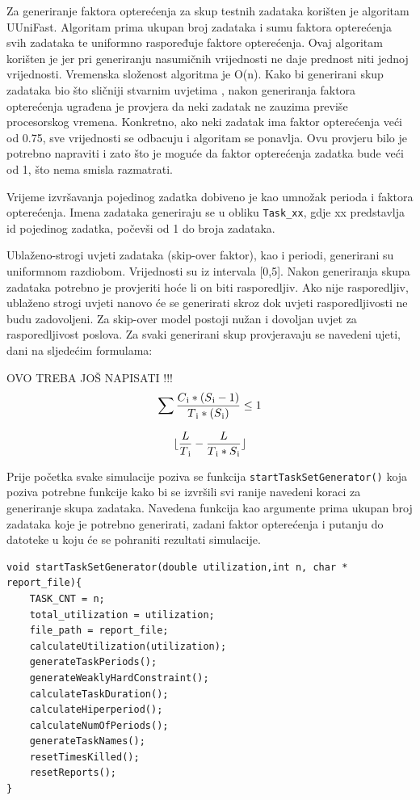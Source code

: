 \documentclass[../zavrsni.tex]{subfiles}
\begin{document}
Za generiranje faktora opterećenja za skup testnih zadataka korišten je algoritam UUniFast. Algoritam prima ukupan broj zadataka 
i sumu faktora opterećenja svih zadataka te uniformno raspoređuje faktore opterećenja. Ovaj algoritam korišten je jer pri generiranju nasumičnih
vrijednosti ne daje prednost niti jednoj vrijednosti. Vremenska složenost algoritma je O(n). Kako bi generirani skup zadataka bio što sličniji stvarnim uvjetima
, nakon generiranja faktora opterećenja ugrađena je provjera da neki zadatak ne zauzima previše procesorskog vremena. Konkretno, ako neki zadatak ima faktor
opterećenja veći od 0.75, sve vrijednosti se odbacuju i algoritam se ponavlja. Ovu provjeru bilo je potrebno napraviti i zato što je moguće da faktor
opterećenja zadatka bude veći od 1, što nema smisla razmatrati.

Vrijeme izvršavanja pojedinog zadatka dobiveno je kao umnožak perioda i faktora opterećenja.
Imena zadataka generiraju se u obliku \texttt{Task\_xx}, gdje xx predstavlja id pojedinog zadatka, počevši od 1 do broja zadataka.

Ublaženo-strogi uvjeti zadataka (skip-over faktor), kao i periodi, generirani su uniformnom razdiobom. Vrijednosti su iz intervala [0,5].
Nakon generiranja skupa zadataka potrebno je provjeriti hoće li on biti rasporedljiv. Ako nije rasporedljiv, ublaženo strogi uvjeti nanovo 
će se generirati skroz dok uvjeti rasporedljivosti ne budu zadovoljeni. Za skip-over model postoji nužan i dovoljan uvjet za rasporedljivost 
poslova. Za svaki generirani skup provjeravaju se navedeni ujeti, dani na sljedećim formulama: 

OVO TREBA JOŠ NAPISATI !!!
\begin{equation*}
    \sum\frac{C\textsubscript{i}*(S\textsubscript{i}-1)}{T\textsubscript{i}*(S\textsubscript{i})} \le 1
\end{equation*}

\begin{equation*}
    \lfloor \frac{L}{T\textsubscript{i}}-\frac{L}{T\textsubscript{i}*S\textsubscript{i}} \rfloor
\end{equation*}



Prije početka svake simulacije poziva se funkcija \texttt{startTaskSetGenerator()} koja poziva potrebne funkcije kako bi se izvršili 
svi ranije navedeni koraci za generiranje skupa zadataka. Navedena funkcija kao argumente prima ukupan broj zadataka koje je potrebno generirati, zadani 
faktor opterećenja i putanju do datoteke u koju će se pohraniti rezultati simulacije.
\begin{lstlisting}[style=CStyle,caption={Funckija startTaskSetGenerator},captionpos=b]
void startTaskSetGenerator(double utilization,int n, char * report_file){
    TASK_CNT = n; 
    total_utilization = utilization; 
    file_path = report_file;
    calculateUtilization(utilization);
    generateTaskPeriods();
    generateWeaklyHardConstraint();
    calculateTaskDuration();
    calculateHiperperiod();
    calculateNumOfPeriods();
    generateTaskNames();
    resetTimesKilled();
    resetReports();
}
\end{lstlisting}
\end{document}
